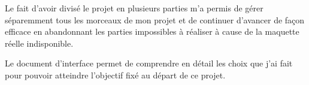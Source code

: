 \smallskip

Le fait d'avoir divisé le projet en plusieurs parties m'a permis de
gérer  séparemment tous les morceaux de mon  projet et de continuer d'avancer
de façon efficace en abandonnant les parties impossibles à réaliser à
cause de la  maquette réelle indisponible.

Le document d'interface permet de comprendre en détail les choix que j'ai fait
pour pouvoir atteindre l'objectif fixé au départ de ce projet.


\newpage





